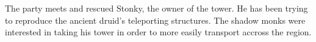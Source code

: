 The party meets and rescued Stonky, the owner of the tower.
He has been trying to reproduce the ancient druid's teleporting structures.
The shadow monks were interested in taking his tower in order to more easily transport accross the region.